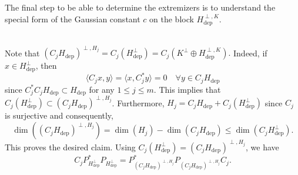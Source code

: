 \documentclass[11pt,a4paper,reqno]{amsart}
\numberwithin{equation}{section}
\theoremstyle{definition}
\newcommand{\<}{\ensuremath \leq}
\renewcommand{\>}{\ensuremath \geq}
\begin{document}
The final step to be able to determine the extremizers is to understand the special form of the Gaussian constant $c$ on the block $H_{\mathrm{dep}}^{\perp,K}.$  

\hfill \\

Note that $(C_jH_{\mathrm{dep}})^{\perp,H_j}=C_j(H_{\mathrm{dep}}^\perp)=C_j(K^\perp \oplus H_{\mathrm{dep}}^{\perp,K}).$ Indeed, if $x \in H_{\mathrm{dep}}^\perp$, then $$\langle C_jx,y\rangle=\langle x,C_j^*y\rangle=0 \quad \forall y \in C_jH_{\mathrm{dep}}$$ since $C_j^*C_jH_{\mathrm{dep}} \subset H_{\mathrm{dep}}$ for any $1 \leq j \leq m.$ This implies that $C_j(H_{\mathrm{dep}}^\perp) \subset (C_jH_{\mathrm{dep}})^{\perp,H_j}$. Furthermore, $H_j=C_jH_{\mathrm{dep}} +C_j(H_{\mathrm{dep}}^\perp)$ since $C_j$ is surjective and consequently, $$\dim((C_jH_{\mathrm{dep}})^{\perp,H_j})=\dim(H_j)-\dim(C_jH_{\mathrm{dep}}) \leq \dim(C_jH_{\mathrm{dep}}^\perp).$$ This proves the desired claim. Using $C_j(H_{\mathrm{dep}}^\perp)=(C_jH_{\mathrm{dep}})^{\perp,H_j}$, we have \begin{equation} \label{Proj_commute_under_C_j}  C_jP_{H_{\mathrm{dep}}^\perp}^*P_{H_{\mathrm{dep}}^\perp}=P_{(C_jH_{\mathrm{dep}})^{\perp,H_j}}^*P_{(C_jH_{\mathrm{dep}})^{\perp,H_j}}C_j.\end{equation} 

\hfill \\
\end{document}
